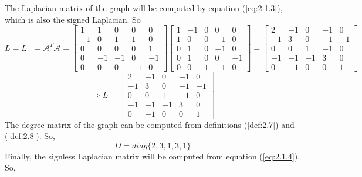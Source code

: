     The Laplacian matrix of the graph will be computed by equation (\ref{eq:2.1.3}), which is also the signed Laplacian. So
    \begin{equation*}
        L = L_- = \mathcal{A}^T\mathcal{A} =\left[\begin{matrix}
            1 & 1 & 0 & 0 & 0\\
            -1 & 0 & 1 & 1 & 0\\
            0 & 0 & 0 & 0 & 1\\
            0 & -1 & -1 & 0 & -1\\
            0 & 0 & 0 & -1 & 0
        \end{matrix}\right] \left[\begin{matrix}
            1 & -1 & 0 & 0 & 0\\
            1 & 0 & 0 & -1 & 0\\
            0 & 1 & 0 & -1 & 0\\
            0 & 1 & 0 & 0 & -1\\
            0 & 0 & 1 & -1 & 0
        \end{matrix}\right] = \left[ \begin{matrix}
            2 & -1 & 0 & -1 & 0\\
            -1 & 3 & 0 & -1 & -1\\
            0 & 0 & 1 & -1 & 0\\
            -1 & -1 & -1 & 3 & 0\\
            0 & -1 & 0 & 0 & 1
        \end{matrix}\right]
    \end{equation*}
    \begin{equation*}
        \Rightarrow L = \left[ \begin{matrix}
            2 & -1 & 0 & -1 & 0\\
            -1 & 3 & 0 & -1 & -1\\
            0 & 0 & 1 & -1 & 0\\
            -1 & -1 & -1 & 3 & 0\\
            0 & -1 & 0 & 0 & 1
        \end{matrix}\right]
    \end{equation*}
    The degree matrix of the graph can be computed from definitions (\ref{def:2.7}) and (\ref{def:2.8}). So,
    \begin{equation*}
        D = diag\{2,3,1,3,1\}
    \end{equation*}
    Finally, the signless Laplacian matrix will be computed from equation (\ref{eq:2.1.4}). So,
